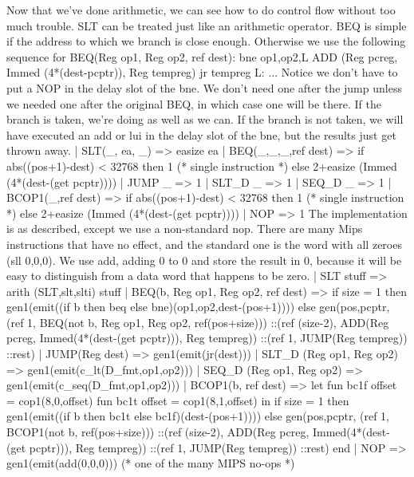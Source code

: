 Now that we've done arithmetic, we can see how to do control flow without
too much trouble.
\code{}SLT\edoc{} can be treated just like an arithmetic operator.
\code{}BEQ\edoc{} is simple if the address to which we branch is close enough.
Otherwise we use the following sequence for \code{}BEQ(Reg op1, Reg op2, ref dest)\edoc{}:
\verbatim
        bne op1,op2,L
        ADD (Reg pcreg, Immed (4*(dest-pcptr)), Reg tempreg)
        jr tempreg
     L: ...
\endverbatim
Notice we don't have to put a \code{}NOP\edoc{} in the delay slot of the \code{}bne\edoc{}.
We don't need one after the jump unless we needed one after the 
original \code{}BEQ\edoc{}, in which case one will be there.
If the branch is taken, we're doing as well as we can.
If the branch is not taken, we will have executed an \code{}add\edoc{} or \code{}lui\edoc{} in the 
delay slot of the \code{}bne\edoc{}, but the results just get thrown away.
\enddocs
{}
\endmoddef
| SLT(_, ea, _) => easize ea
| BEQ(_,_,_,ref dest) => 
        if abs((pos+1)-dest) < 32768 then 1 (* single instruction *)
        else 2+easize (Immed (4*(dest-(get pcptr))))
| JUMP _ => 1
| SLT_D _ => 1
| SEQ_D _ => 1
| BCOP1(_,ref dest) => 
        if abs((pos+1)-dest) < 32768 then 1 (* single instruction *)
        else 2+easize (Immed (4*(dest-(get pcptr))))
| NOP => 1
\endcode
{}
The implementation is as described, except we use a 
non-standard \code{}nop\edoc{}.
There are many Mips instructions that have no effect, and the standard
one is the word with all zeroes (\code{}sll 0,0,0\edoc{}).
We use \code{}add\edoc{},  adding 0 to 0 and store the result in 0, because it
will be easy to distinguish from a data word that happens to be zero.
\enddocs
{}
\endmoddef
| SLT stuff => arith (SLT,slt,slti) stuff
| BEQ(b, Reg op1, Reg op2, ref dest) =>
    if size = 1 then 
         gen1(emit((if b then beq else bne)(op1,op2,dest-(pos+1))))
    else gen(pos,pcptr,
                  (ref 1, BEQ(not b, Reg op1, Reg op2, ref(pos+size)))
                  ::(ref (size-2), 
                      ADD(Reg pcreg, Immed(4*(dest-(get pcptr))), Reg tempreg))
                  ::(ref 1, JUMP(Reg tempreg))
                  ::rest)
| JUMP(Reg dest) => gen1(emit(jr(dest)))
| SLT_D (Reg op1, Reg op2) => 
     gen1(emit(c_lt(D_fmt,op1,op2)))
| SEQ_D (Reg op1, Reg op2) => 
     gen1(emit(c_seq(D_fmt,op1,op2)))
| BCOP1(b, ref dest) =>
    let fun bc1f offset = cop1(8,0,offset)
        fun bc1t offset = cop1(8,1,offset)
    in  if size = 1 then 
             gen1(emit((if b then bc1t else bc1f)(dest-(pos+1))))
        else gen(pos,pcptr,
                  (ref 1, BCOP1(not b, ref(pos+size)))
                  ::(ref (size-2), 
                      ADD(Reg pcreg, Immed(4*(dest-(get pcptr))), Reg tempreg))
                  ::(ref 1, JUMP(Reg tempreg))
                  ::rest)
    end
| NOP => gen1(emit(add(0,0,0)))         (* one of the many MIPS no-ops *)
\endcode
{}

